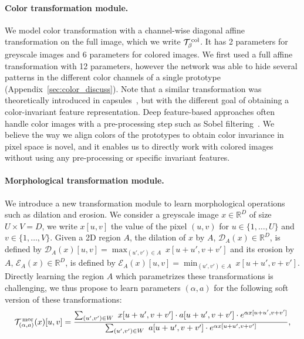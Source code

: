 \documentclass{article}
\def\RR{{\mathbb R}}
\begin{document}
\vspace{-0.7em}
\paragraph{Color transformation module.} We model color transformation with a channel-wise 
diagonal affine transformation on the full image, which we write 
${\mathcal T}^{\,\textrm{col}}_\beta$. It has 2 parameters for greyscale images and 6 parameters for 
colored images. We first used a full affine transformation with 12 parameters, however the 
network was able to hide several patterns in the different color channels of a single 
prototype (Appendix~\ref{sec:color_discuss}). Note that a similar transformation was 
theoretically introduced in capsules~\cite{kosiorekStackedCapsuleAutoencoders2019}, but with 
the different goal of obtaining a color-invariant feature representation. Deep feature-based 
approaches often handle color images with a pre-processing step such as Sobel 
filtering~\cite{caronDeepClusteringUnsupervised2018, jiInvariantInformationClustering2019, 
kosiorekStackedCapsuleAutoencoders2019}.
We believe the way we align colors of the prototypes to obtain color invariance in pixel 
space is novel, and it enables us to directly work with colored images without using any 
pre-processing or specific invariant features.

\vspace{-0.7em}
\paragraph{Morphological transformation module.} We introduce a new transformation module to 
learn morphological operations~\cite{haralick1987image} such as dilation and erosion. We 
consider a greyscale image $x \in \RR^{D}$ of size $U\times V=D$, we write $x[u,v]$ the value 
of the pixel $(u,v)$ for $u\in \{1,\ldots,U\}$ and $v\in \{1,\ldots,V\}$. Given a 2D region 
$A$, the dilation of $x$ by $A$, $\mathcal{D}_A(x)\in \RR^{D}$, is defined by 
$\mathcal{D}_A(x)[u,v]=\max_{(u',v') \in A}~x[u+u',v+v']$ and its erosion by $A$, 
$\mathcal{E}_A(x)\in \RR^{D}$, is defined by $\mathcal{E}_A(x)[u,v]=\min_{(u',v') \in 
A}~x[u+u',v+v']$. Directly learning the region $A$ which parametrizes these transformations 
is challenging, we thus propose to learn parameters $(\alpha, a)$ for the following soft 
version of these transformations:
\begin{equation}
  {\mathcal T}^{\,\textrm{mor}}_{(\alpha, a)}(x)[u,v] = \dfrac{\sum_{(u',v') \in W}~x[u+u',v+v']\cdot 
  a[u+u',v+v'] \cdot e^{\alpha x[u+u',v+v']}  }{\sum_{(u',v') \in W}~a[u+u',v+v']\cdot 
  e^{\alpha x[u+u',v+v']}},
\end{equation}
\end{document}
